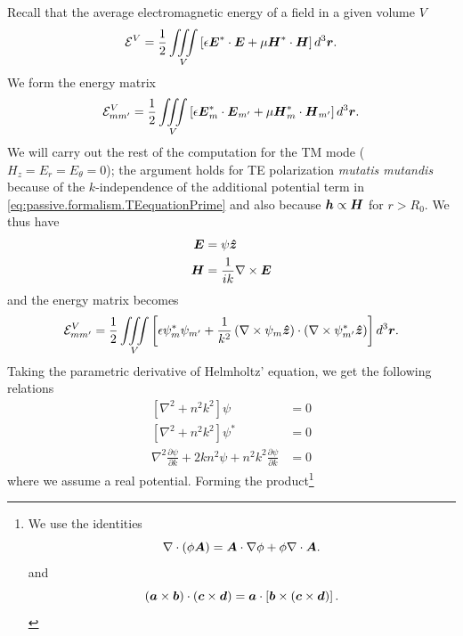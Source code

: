 Recall that the average electromagnetic energy of a field
in a given volume $V$
  \begin{equation}
   \mathcal{E}^V = \frac{1}{2}\mathop{\iiint}_V\left[\epsilon\boldsymbol{E}^*\cdot\boldsymbol{E}+\mu\boldsymbol{H}^*\cdot\boldsymbol{H}\right]d^3\boldsymbol{r}.
  \end{equation}
We form the energy matrix 
  \begin{equation}
   \mathcal{E}^V_{mm'} = \frac{1}{2}\mathop{\iiint}_V\left[\epsilon\boldsymbol{E}^*_m\cdot\boldsymbol{E}_{m'}+\mu\boldsymbol{H}^*_m\cdot\boldsymbol{H}_{m'}\right]d^3\boldsymbol{r}.
  \end{equation}
We will carry out the rest of the computation for the TM mode ($H_z=E_r=E_\theta=0$);
the argument holds for TE polarization \textit{mutatis mutandis} because of the
$k$-independence of the additional potential term in \eqref{eq:passive.formalism.TEequationPrime}
and also because $\boldsymbol{h}\propto\boldsymbol{H}$ for $r>R_0$. We thus have 
  \begin{align*}
    \boldsymbol{E}	&= \psi\boldsymbol{\hat{z}}	\\
    \boldsymbol{H}	&= \frac{1}{ik}\nabla\times\boldsymbol{E}
  \end{align*}
and the energy matrix becomes
\begin{align}
    \mathcal{E}^V_{mm'}	&= \frac{1}{2}\mathop{\iiint}_V\left[\epsilon\psi^*_{m}\psi_{m'}+\frac{1}{k^2}\left(\nabla\times\psi_{m}\boldsymbol{\hat{z}}\right)\cdot\left(\nabla\times\psi^*_{m'}\boldsymbol{\hat{z}}\right)\right]d^3\boldsymbol{r}.	\nonumber\\
  \end{align}
Taking the parametric derivative of Helmholtz' equation, we get the 
following relations
  \begin{subequations}
  \label{eq:passive.formalism.parametricHelmholtz}
  \begin{align}
   \left[\nabla^2+n^2k^2\right]\psi								&=0	\\
   \left[\nabla^2+n^2k^2\right]\psi^*								&=0	\\
   \nabla^2\frac{\partial\psi}{\partial k}+2kn^2\psi+n^2k^2\frac{\partial\psi}{\partial k}	&=0
  \end{align}
  \end{subequations}
where we assume a real potential.
Forming the product\footnote{We use the identities \cite[Appendix II]{STR41}
  \begin{equation*}
    \nabla\cdot\left(\phi\boldsymbol{A}\right) = \boldsymbol{A}\cdot\nabla\phi+\phi\nabla\cdot\boldsymbol{A}.
  \end{equation*}
and
  \begin{equation*}
    (\boldsymbol{a}\times\boldsymbol{b})\cdot(\boldsymbol{c}\times\boldsymbol{d}) = \boldsymbol{a}\cdot\left[\boldsymbol{b}\times(\boldsymbol{c}\times\boldsymbol{d})\right].
  \end{equation*}
}
